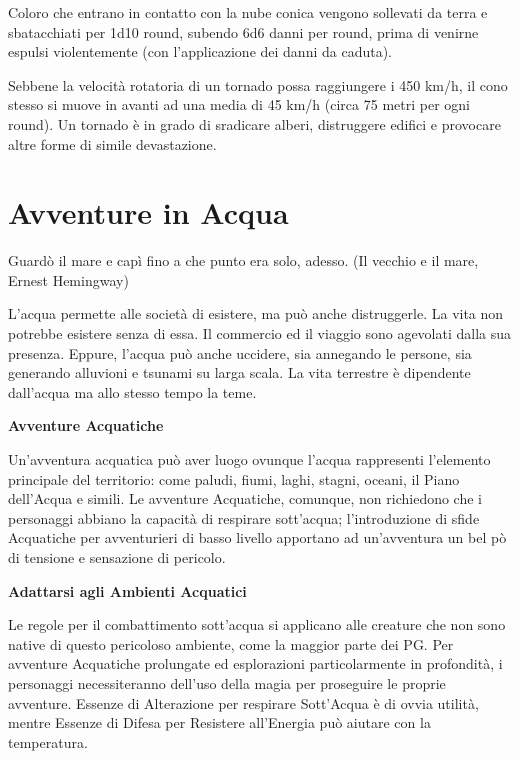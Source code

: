 \documentclass[a4paper,11pt,twoside,openany]{book}
\begin{document}
Coloro che entrano in contatto con la nube conica vengono sollevati da terra e sbatacchiati per 1d10 round, subendo 6d6 danni per round, prima di venirne espulsi violentemente (con l'applicazione dei danni da caduta).

Sebbene la velocità rotatoria di un tornado possa raggiungere i 450 km/h, il cono stesso si muove in avanti ad una media di 45 km/h (circa 75 metri per ogni round). Un tornado è in grado di sradicare alberi, distruggere edifici e provocare altre forme di simile devastazione.

\pagebreak

\section{Avventure in Acqua}

\label{avventure-in-acqua}
\begin{tcolorbox}[enhanced,arc=5pt,boxrule=0.3pt]{Guardò il mare e capì fino a che punto era solo, adesso. (Il vecchio e il mare, Ernest Hemingway)}\end{tcolorbox}\medskip

L'acqua permette alle società di esistere, ma può anche distruggerle. La vita non potrebbe esistere senza di essa. Il commercio ed il viaggio sono agevolati dalla sua presenza. Eppure, l'acqua può anche uccidere, sia annegando le persone, sia generando alluvioni e tsunami su larga scala. La vita terrestre è dipendente dall'acqua ma allo stesso tempo la teme.

\textbf{Avventure Acquatiche}

Un'avventura acquatica può aver luogo ovunque l'acqua rappresenti l'elemento principale del territorio: come paludi, fiumi, laghi, stagni, oceani, il Piano dell'Acqua e simili. Le avventure Acquatiche, comunque, non richiedono che i personaggi abbiano la capacità di respirare sott'acqua; l'introduzione di sfide Acquatiche per avventurieri di basso livello apportano ad un'avventura un bel pò di tensione e sensazione di pericolo.

\textbf{Adattarsi agli Ambienti Acquatici}

Le regole per il combattimento sott'acqua si applicano alle creature che non sono native di questo pericoloso ambiente, come la maggior parte dei PG. Per avventure Acquatiche prolungate ed esplorazioni particolarmente in profondità, i personaggi necessiteranno dell'uso della magia per proseguire le proprie avventure. Essenze di Alterazione per respirare Sott'Acqua è di ovvia utilità, mentre Essenze di Difesa per Resistere all'Energia può aiutare con la temperatura.
\end{document}
